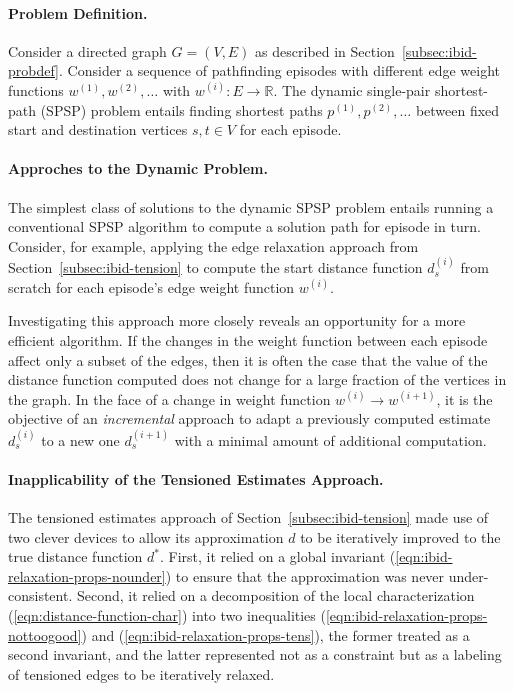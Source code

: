 \paragraph{Problem Definition.}
Consider a directed graph $G = (V,E)$ as described in
Section~\ref{subsec:ibid-probdef}.
Consider a sequence of pathfinding episodes
with different edge weight functions $w^{(1)}, w^{(2)}, \dots$
with $w^{(i)} : E \rightarrow \mathbb{R}$.
The dynamic single-pair shortest-path (SPSP) problem
entails finding shortest paths $p^{(1)}, p^{(2)}, \dots$
between fixed start and destination vertices $s,t \in V$
for each episode.

\paragraph{Approches to the Dynamic Problem.}
The simplest class of solutions to the dynamic SPSP problem
entails running a conventional SPSP algorithm to compute a solution
path for episode in turn.
Consider, for example, applying the edge relaxation approach
from Section~\ref{subsec:ibid-tension}
to compute the start distance function $d_s^{(i)}$ from scratch
for each episode's edge weight function $w^{(i)}$.

Investigating this approach more closely reveals an opportunity for
a more efficient algorithm.
If the changes in the weight function between each episode affect
only a subset of the edges,
then it is often the case that the value of the distance function
computed does not change for a large fraction of the vertices in the
graph.
In the face of a change in weight function
$w^{(i)} \rightarrow w^{(i+1)}$,
it is the objective of an \emph{incremental} approach
to adapt a previously computed estimate $d_s^{(i)}$
to a new one $d_s^{(i+1)}$ with a minimal amount of additional
computation.

\paragraph{Inapplicability of the Tensioned Estimates Approach.}
The tensioned estimates approach of Section~\ref{subsec:ibid-tension}
made use of two clever devices to allow its approximation $d$ to be
iteratively improved to the true distance function $d^*$.
First, it relied on a global invariant
(\ref{eqn:ibid-relaxation-props-nounder})
to ensure that the approximation was never under-consistent.
Second, it relied on a decomposition of the local characterization
(\ref{eqn:distance-function-char})
into two inequalities
(\ref{eqn:ibid-relaxation-props-nottoogood})
and (\ref{eqn:ibid-relaxation-props-tens}),
the former treated as a second invariant,
and the latter represented not as a constraint but as a labeling
of tensioned edges to be iteratively relaxed.

